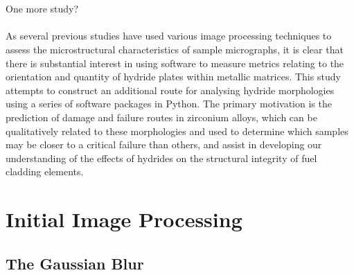 \documentclass{article}
\begin{document}
    \\
    \\
    One more study?
    \\
    \\
    As several previous studies have used various image processing techniques to assess the microstructural characteristics of sample micrographs, it is clear that there is substantial interest in using software to measure metrics relating to the orientation and quantity of hydride plates within metallic matrices. This study attempts to construct an additional route for analysing hydride morphologies using a series of software packages in Python. The primary motivation is the prediction of damage and failure routes in zirconium alloys, which can be qualitatively related to these morphologies and used to determine which samples may be closer to a critical failure than others, and assist in developing our understanding of the effects of hydrides on the structural integrity of fuel cladding elements.
	\\
	\section{Initial Image Processing}
	\subsection{The Gaussian Blur}
\end{document}
